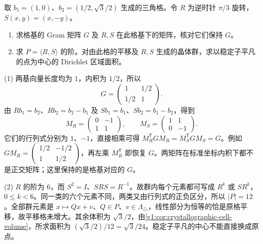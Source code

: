 \begin{exercise}
	\label{g1:ex:triangular-point-group-matrices}
	取 \(b_1=(1,0)\)、\(b_2=(1/2,\sqrt3/2)\) 生成的三角格。令 \(R\) 为逆时针 \(\pi/3\) 旋转，\(S(x,y)=(x,-y)\)。
	\begin{enumerate}
		\item 求格基的 Gram 矩阵 \(G\) 及 \(R,S\) 在此格基下的矩阵，核对它们保持 \(G\)。
		\item 求 \(P=\langle R,S\rangle\) 的阶。对由此格的平移及 \(R,S\) 生成的晶体群，求以稳定子平凡的点为中心的 Dirichlet 区域面积。
	\end{enumerate}
\end{exercise}
\begin{solution}
	(1) 两基向量长度均为 \(1\)，内积为 \(1/2\)，所以
	\[
		G=\begin{pmatrix}1&1/2\\1/2&1\end{pmatrix}.
	\]
	由 \(Rb_1=b_2\)、\(Rb_2=b_2-b_1\) 及 \(Sb_1=b_1\)、\(Sb_2=b_1-b_2\)，得到
	\[
		M_R=\begin{pmatrix}0&-1\\1&1\end{pmatrix},\qquad
		M_S=\begin{pmatrix}1&1\\0&-1\end{pmatrix}.
	\]
	它们的行列式分别为 \(1\)、\(-1\)，直接相乘可得 \(M_R^{\mathsf T}GM_R=M_S^{\mathsf T}GM_S=G\)。例如 \(GM_R=\left(\begin{smallmatrix}1/2&-1/2\\1&1/2\end{smallmatrix}\right)\)，再左乘 \(M_R^{\mathsf T}\) 即恢复 \(G\)。两矩阵在标准坐标内积下都不是正交矩阵；这里保持的是格基对应的 \(G\)。

	(2) \(R\) 的阶为 \(6\)，而 \(S^2=I\)、\(SRS=R^{-1}\)。故群内每个元素都可写成 \(R^k\) 或 \(SR^k\)，\(0\le k<6\)。同一类的六个元素不同，两类又由行列式的正负区分，所以 \(|P|=12\)。全部群元素是 \(x\mapsto Qx+v\)、\(Q\in P\)、\(v\in\Lambda_{\triangle}\)，线性部分为恒等的恰是原格平移，故平移格未增大。其余体积为 \(\sqrt3/2\)，由\cref{g1:cor:crystallographic-cell-volume}，所求面积为 \((\sqrt3/2)/12=\sqrt3/24\)。稳定子平凡的中心不能直接换成原点。
\end{solution}

